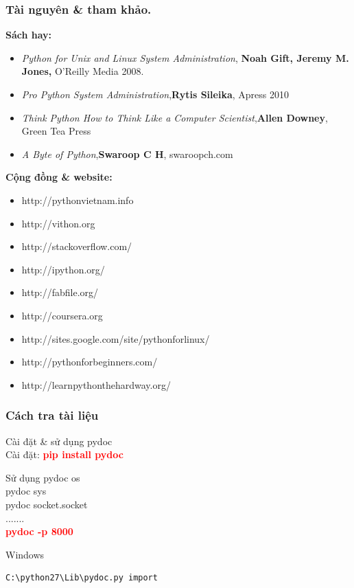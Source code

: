 \documentclass[10pt]{beamer}
\newcommand\sFontvi{\fontsize{8}{7.2}\selectfont} %
\begin{document}
\label{Tham khao}
\begin{frame}[fragile]
\frametitle{Tài nguyên \& tham khảo.}
\framebreak
\pause
\sFontvi
\textbf{Sách hay:} \label{Ebook tham khao}
\framebreak
\pause
\begin{itemize}
\item \textit{Python for Unix and Linux System Administration},\textbf{ Noah Gift, Jeremy M. Jones,} O'Reilly Media 2008.
\item \textit{Pro Python System Administration},\textbf{Rytis Sileika}, Apress 2010
\item \textit{Think Python How to Think Like a Computer Scientist},\textbf{Allen Downey}, Green Tea Press
\item \textit{A Byte of Python},\textbf{Swaroop C H}, swaroopch.com
\end{itemize}
%
\framebreak
\pause
\textbf{Cộng đồng \& website:}
\framebreak
\pause
\begin{itemize}
	\item http://pythonvietnam.info
	\item http://vithon.org
	\item http://stackoverflow.com/
	\item http://ipython.org/
	\item http://fabfile.org/
	\item http://coursera.org
	\item http://sites.google.com/site/pythonforlinux/	
	\item http://pythonforbeginners.com/
	\item http://learnpythonthehardway.org/
\end{itemize}
\end{frame}
\label{Bonus}
\label{Slide: Cach tra tai lieu}
\begin{frame}[fragile]
\frametitle{Cách tra tài liệu}
Cài đặt \& sử dụng pydoc \\ \pause
Cài đặt: \textcolor{red}{\textbf{pip install pydoc}}\\
\begin{block}{Sử dụng}
pydoc os \\
pydoc sys \\
pydoc socket.socket\\ 
.......\\
\pause
\textcolor{red}{\textbf{pydoc -p 8000}}
\end{block} 
\pause
\begin{block}{Windows} 
\begin{verbatim}
C:\python27\Lib\pydoc.py import
\end{verbatim} 
\end{block}
\end{frame}
\end{document}
